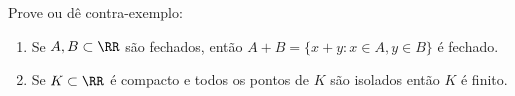 Prove ou dê contra-exemplo:
	\begin{enumerate}
		\item Se $A, B \subset \RR$ são fechados, então $A + B = \{ x + y : x \in A, y \in B\}$ é fechado.
		\item Se $K \subset \RR$ é compacto e todos os pontos de $K$ são isolados então $K$ é finito. 
	\end{enumerate}